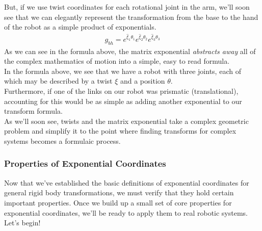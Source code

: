 \documentclass[oneside]{book}
\begin{document}
But, if we use twist coordinates for each rotational joint in the arm, we'll soon see that we can elegantly represent the transformation from the base to the hand of the robot as a simple product of exponentials.
\begin{align}
    g_{bh} = e^{\hat\xi_1 \theta_1}e^{\hat\xi_2 \theta_2}e^{\hat\xi_3 \theta_3}
\end{align}
As we can see in the formula above, the matrix exponential \textit{abstracts away} all of the complex mathematics of motion into a simple, easy to read formula.\\
In the formula above, we see that we have a robot with three joints, each of which may be described by a twist $\xi$ and a position $\theta$.\\
Furthermore, if one of the links on our robot was prismatic (translational), accounting for this would be as simple as adding another exponential to our transform formula.\\
As we'll soon see, twists and the matrix exponential take a complex geometric problem and simplify it to the point where finding transforms for complex systems becomes a formulaic process.

\subsubsection{Properties of Exponential Coordinates}
Now that we've established the basic definitions of exponential coordinates for general rigid body transformations, we must verify that they hold certain important properties. Once we build up a small set of core properties for exponential coordinates, we'll be ready to apply them to real robotic systems. Let's begin!
\end{document}
